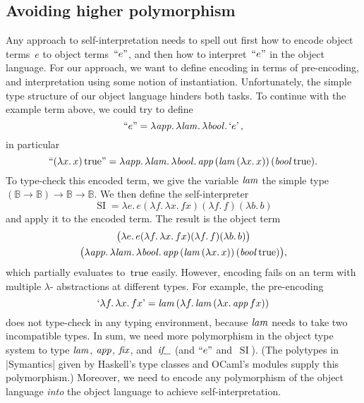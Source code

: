 \documentclass[preprint]{sigplanconf}
\newcommand{\BB}{\mathbb{B}}
\newcommand{\fun}[1]{\mathopen{\lambda\mathord{#1}.\,}}
\newcommand{\True}{\mathinner{\mathrm{true}}}
\newcommand{\Encode}[1]{\mathinner{\mathopen{\text{``}}#1\mathclose{\text{''}}}}
\newcommand{\encode}[1]{\mathinner{\mathopen{\text{`}}#1\mathclose{\text{'}}}}
\newcommand{\ident}[1]{\mathinner{\text{\textit{#1\/}}}}
\DeclareMathOperator{\si}{SI}
\begin{document}
\subsection{Avoiding higher polymorphism}

Any approach to self\hyp interpretation needs to spell out first how to
encode object terms~$e$ to object terms~$\Encode{e}$, and then how to
interpret~$\Encode{e}$ in the object language.  For our approach, we
want to define encoding in terms of pre-encoding, and interpretation
using some notion of instantiation.  Unfortunately, the simple type
structure of our object language hinders both tasks.  To continue with
the example term above, we could try to define
\begin{equation*}
    \Encode{e} =
    \fun{\ident{app}} \fun{\ident{lam}} \fun{\ident{bool}} \encode{e},
\end{equation*}
in particular
\begin{equation*}
    \Encode{(\fun{x}x)\True} =
    \fun{\ident{app}} \fun{\ident{lam}} \fun{\ident{bool}}
    \ident{app} (\ident{lam} (\fun{x} x))\, (\ident{bool} \True).
\end{equation*}
To type-check this encoded term, we give the variable $\ident{lam}$ the
simple type $(\BB\to\BB)\to\BB\to\BB$.
We then define the self\hyp interpreter
\begin{equation*}
    \si = \fun{e} e
    (\fun{f} \fun{x} fx)
    (\fun{f} f)
    (\fun{b} b)
\end{equation*}
and apply it to the encoded term.  The result is the object term
\begin{multline*}
    \bigl(\fun{e} e (\fun{f} \fun{x} fx) (\fun{f} f) (\fun{b} b)\bigr)
\\
    \bigl(
    \fun{\ident{app}} \fun{\ident{lam}} \fun{\ident{bool}}
    \ident{app} (\ident{lam} (\fun{x} x))\, (\ident{bool} \True)
    \bigr),
\end{multline*}
which partially evaluates to~$\True$ easily.
However, encoding fails on an term with multiple $\lambda$\hyp
abstractions at different types.  For example, the pre-encoding
\begin{equation*}
    \encode{\fun{f}\fun{x}fx}
    = \ident{lam} (\fun{f} \ident{lam} (\fun{x} \ident{app} f x))
\end{equation*}
does not type-check in any typing environment, because $\ident{lam}$ needs
to take two incompatible types.  In sum, we need more polymorphism in the
object type system to type $\ident{lam}$, $\ident{app}$, $\ident{fix}$,
and~$\ident{if\_}$ (and $\Encode{e}$ and~$\si$).
(The polytypes in |Symantics| given by Haskell's type classes and OCaml's
modules supply this polymorphism.)  Moreover, we need to encode any
polymorphism of the object language \emph{into} the object language to achieve
self\hyp interpretation.
\end{document}
